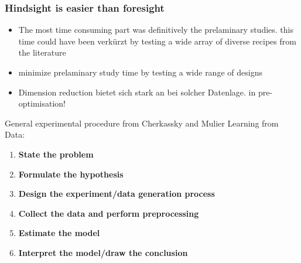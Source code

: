 \subsubsection{Hindsight is easier than foresight}
\begin{itemize}
    \item The most time consuming part was definitively the prelaminary studies. this time could have been verkürzt by testing a wide array of diverse recipes from the literature
    \item minimize prelaminary study time by testing a wide range of designs
    \item Dimension reduction bietet sich stark an bei solcher Datenlage. in pre-optimisation!
\end{itemize}
%
General experimental procedure from Cherkassky and Mulier Learning from Data\cite{cherkassky1998learning}:
\begin{enumerate}
    \item \textbf{State the problem}
    \item \textbf{Formulate the hypothesis}
    \item \textbf{Design the experiment/data generation process}
    \item \textbf{Collect the data and perform preprocessing}
    \item \textbf{Estimate the model}
    \item \textbf{Interpret the model/draw the conclusion}
\end{enumerate}
\iffalse
\textbf{1. Statement of the Problem} There was no clear statement of the problem. Now I would formulate it: "How to produce most insulating layer with least energy? How do we define most insulating?" That's why there are two output variables rather than one.
\textbf{2. Hypothesis Formulation} formulate an unknown dependency and define input and output variables.
\textbf{3. Data Generation and Experiment Design} can be either in control of the modeler (designed experiment) or in an observational setting. The data collection can affect the sampling distribution and influence the next steps. 
\textbf{4. Collect the Data and Perform Preprocessing} here outliers are detected and data preprocessing/encoding/feature selection. Scaling by standard deviation might be a good idea, but independent scaling of variables can lead to suboptimal representation for the learning task. Feature selection: A small number of informative features make the task of estimating dependencies easier. 
\textbf{5. Model Estimation} The main goal is to construct a model for accurate prediction of future outputs
\textbf{6. Interpret the Model and Drawing Conclusions} The interpretability and accuracy of the model are compete. In classical statistics such as linearly parametrized function will suit both requirements. More complex and flexible models might lead to better estimates with less interpretability. Identifying the most important input variables. \cite{cherkassky1998learning}
\fi

